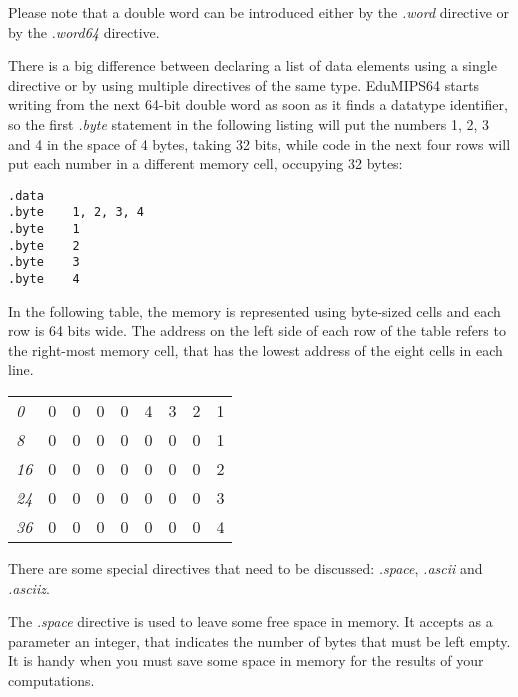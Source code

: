 \documentclass[letterpaper,10pt,english]{sphinxmanual}
\begin{document}
Please note that a double word can be introduced either by the \emph{.word}
directive or by the \emph{.word64} directive.

There is a big difference between declaring a list of data elements
using a single directive or by using multiple directives of the same type. EduMIPS64
starts writing from the next 64-bit double word as soon as it finds a datatype identifier,
so the first \emph{.byte} statement in the following listing will put
the numbers 1, 2, 3 and 4 in the space of 4 bytes, taking 32 bits, while code in
the next four rows will put each number in a different memory cell, occupying 32
bytes:

\begin{Verbatim}[commandchars=@\[\]]
.data
.byte    1, 2, 3, 4
.byte    1
.byte    2
.byte    3
.byte    4
\end{Verbatim}

In the following table, the memory is represented using byte-sized cells
and each row is 64 bits wide. The address on the left side of each row of the
table refers to the right-most memory cell, that has the lowest address of the
eight cells in each line.

\begin{tabulary}{\linewidth}{|L|L|L|L|L|L|L|L|L|}
\hline

\emph{0}
 & 
0
 & 
0
 & 
0
 & 
0
 & 
4
 & 
3
 & 
2
 & 
1
\\

\emph{8}
 & 
0
 & 
0
 & 
0
 & 
0
 & 
0
 & 
0
 & 
0
 & 
1
\\

\emph{16}
 & 
0
 & 
0
 & 
0
 & 
0
 & 
0
 & 
0
 & 
0
 & 
2
\\

\emph{24}
 & 
0
 & 
0
 & 
0
 & 
0
 & 
0
 & 
0
 & 
0
 & 
3
\\

\emph{36}
 & 
0
 & 
0
 & 
0
 & 
0
 & 
0
 & 
0
 & 
0
 & 
4
\\
\hline
\end{tabulary}


There are some special directives that need to be discussed: \emph{.space},
\emph{.ascii} and \emph{.asciiz}.

The \emph{.space} directive is used to leave some free space in memory. It
accepts as a parameter an integer, that indicates the number of bytes that must
be left empty. It is handy when you must save some space in memory for the
results of your computations.
\end{document}
